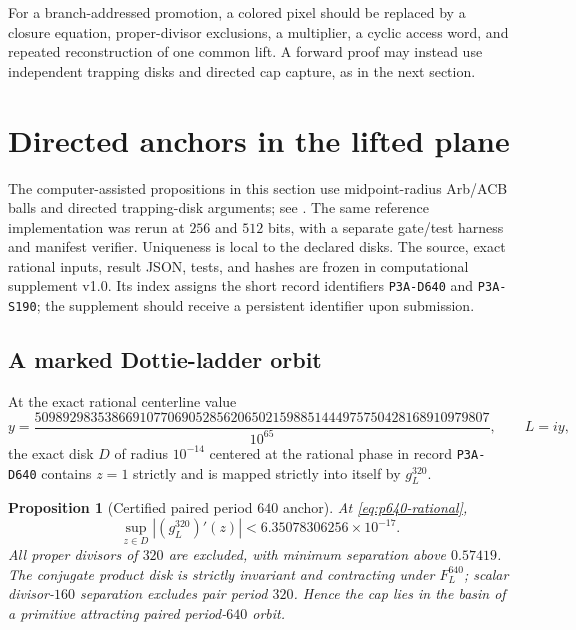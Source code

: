 \documentclass[11pt]{article}
\newtheorem{proposition}[theorem]{Proposition}
\theoremstyle{definition}
\theoremstyle{remark}
\begin{document}
For a branch-addressed promotion, a colored pixel should be replaced by a closure equation, proper-divisor exclusions, a multiplier, a cyclic access word, and repeated reconstruction of one common lift.  A forward proof may instead use independent trapping disks and directed cap capture, as in the next section.

\section{Directed anchors in the lifted plane}

The computer-assisted propositions in this section use midpoint-radius Arb/ACB balls and directed trapping-disk arguments; see \citet{MooreKearfottCloud2009,Johansson2017,Rump2010}.  The same reference implementation was rerun at $256$ and $512$ bits, with a separate gate/test harness and manifest verifier.  Uniqueness is local to the declared disks.  The source, exact rational inputs, result JSON, tests, and hashes are frozen in computational supplement v1.0.  Its index assigns the short record identifiers \texttt{P3A-D640} and \texttt{P3A-S190}; the supplement should receive a persistent identifier upon submission.

\subsection{A marked Dottie-ladder orbit}

At the exact rational centerline value
\begin{equation}
  y=\frac{50989298353866910770690528562065021598851444975750428168910979807}{10^{65}},
  \qquad L=iy,
  \label{eq:p640-rational}
\end{equation}
the exact disk $D$ of radius $10^{-14}$ centered at the rational phase in record \texttt{P3A-D640} contains $z=1$ strictly and is mapped strictly into itself by $g_L^{320}$.

\begin{proposition}[Certified paired period $640$ anchor]\label{prop:p640}
At \cref{eq:p640-rational},
\[
  \sup_{z\in D}|(g_L^{320})'(z)|
  <6.35078306256\times10^{-17}.
\]
All proper divisors of $320$ are excluded, with minimum separation above $0.57419$.  The conjugate product disk is strictly invariant and contracting under $F_L^{640}$; scalar divisor-$160$ separation excludes pair period $320$.  Hence the cap lies in the basin of a primitive attracting paired period-$640$ orbit.
\end{proposition}
\end{document}
